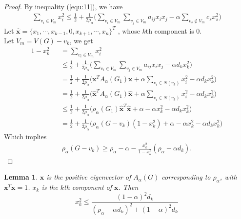 \documentclass[amsthm]{elsart}
\newtheorem{lemma}{Lemma}[section]
\begin{document}
\begin{proof}
By inequality (\ref{equ:11}), we have
\begin{eqnarray*}
\sum \limits_{v_i \in V_m}^{} x_i^2
\leqslant \frac{1}{2} + \frac{1}{2 \rho_\alpha} \Big( \sum \limits_{v_i \in V_m}^{} \sum \limits_{v_j \in V_m}^{} a_{ij} x_i x_j - \alpha \sum \limits_{v_s \notin V_m}^{} c_s x_s^2 \Big)
\end{eqnarray*}
Let $\hat{\textbf{x}} = \{x_1, \cdots, x_{k-1}, 0, x_{k+1}, \cdots, x_n\}^T$ , whose $k$th component is 0. \\
Let $V_m = V(G) - v_k$,  we get
\begin{eqnarray*}
1 - x_k^2
&&= \sum \limits_{v_i \in V_m}^{} x_i^2
\\ &&\leqslant \frac{1}{2} + \frac{1}{2 \rho_\alpha} \Big( \sum \limits_{v_i \in V_m}^{} \sum \limits_{v_j \in V_m}^{} a_{ij} x_i x_j - \alpha d_k x_k^2 \Big)
\\ &&= \frac{1}{2} + \frac{1}{2 \rho_\alpha} \Big( \textbf{x}^T A_\alpha(G_1) \textbf{x} + \alpha \sum \limits_{v_i \in N(v_k)}^{} x_i^2 - \alpha d_k x_k^2 \Big)
\\ &&= \frac{1}{2} + \frac{1}{2 \rho_\alpha} \Big( \hat{\textbf{x}}^T A_\alpha(G_1) \hat{\textbf{x}} + \alpha \sum \limits_{v_i \in N(v_k)}^{} x_i^2 - \alpha d_k x_k^2 \Big)
\\ &&\leqslant \frac{1}{2} + \frac{1}{2 \rho_\alpha} \Big( \rho_\alpha (G_1) \hat{\textbf{x}}^T \hat{\textbf{x}} + \alpha - \alpha  x_k^2 - \alpha d_k x_k^2 \Big)
\\ &&= \frac{1}{2} + \frac{1}{2 \rho_\alpha} \Big( \rho_\alpha (G - v_k) (1 - x_k^2) + \alpha - \alpha  x_k^2 - \alpha d_k x_k^2 \Big)
\end{eqnarray*}
Which implies
\begin{eqnarray*}
  \rho_\alpha (G - v_k) \geqslant \rho_\alpha - \alpha - \frac{x_k^2}{1 - x_k^2} ( \rho_\alpha - \alpha d_k).
\end{eqnarray*}
\end{proof}

\begin{lemma} \label{lem:3}
$\textbf{x}$ is the positive eigenvector of $A_\alpha (G)$ corresponding to $\rho _\alpha$, with $\textbf{x}^T \textbf{x} = 1$. $x_k$ is the $k$th component of $\textbf{x}$. Then \\
\begin{equation} \label{equ:14}
x_k^2 \leqslant \frac{(1 - \alpha)^2 d_k}{(\rho _\alpha - \alpha d_k)^2 + (1 - \alpha)^2 d_k}
\end{equation}
\end{lemma}
\end{document}
